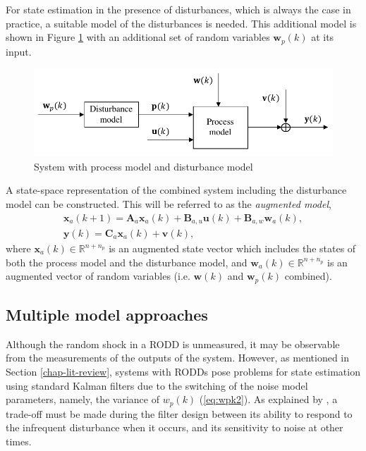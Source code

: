 For state estimation in the presence of disturbances, which is always the case in practice, a suitable model of the disturbances is needed. This additional model is shown in Figure \ref{fig:model_diag_wpupwvy} with an additional set of random variables $\mathbf{w}_p(k)$ at its input.

\begin{figure}[htp]
	\centering
	\includegraphics[width=12.5cm]{images/model_diag_wpupwvy.pdf}
	\caption{System with process model and disturbance model}
	\label{fig:model_diag_wpupwvy}
\end{figure}

A state-space representation of the combined system including the disturbance model can be constructed. This will be referred to as the \textit{augmented model},
\begin{equation} \label{eq:ss_rep_xa}
	\begin{aligned}
		\mathbf{x}_a(k+1) = \mathbf{A}_a \mathbf{x}_a(k) + \mathbf{B}_{a,u} \mathbf{u}(k) + \mathbf{B}_{a,w} \mathbf{w}_{a}(k), \\
		\mathbf{y}(k) = \mathbf{C}_a \mathbf{x}_a(k) + \mathbf{v}(k),
	\end{aligned}
\end{equation}
where $\mathbf{x}_a(k) \in \mathbb{R}^{n+n_p}$ is an augmented state vector which includes the states of both the process model and the disturbance model, and $\mathbf{w}_a(k) \in \mathbb{R}^{n+n_p}$ is an augmented vector of random variables (i.e. $\mathbf{w}(k)$ and $\mathbf{w}_p(k)$ combined).


\subsection{Multiple model approaches}

Although the random shock in a RODD is unmeasured, it may be observable from the measurements of the outputs of the system. However, as mentioned in Section \ref{chap-lit-review}, systems with RODDs pose problems for state estimation using standard Kalman filters due to the switching of the noise model parameters, namely, the variance of $w_p(k)$ (\ref{eq:wpk2}). As explained by \cite{robertson_detection_1995}, a trade-off must be made during the filter design between its ability to respond to the infrequent disturbance when it occurs, and its sensitivity to noise at other times.

